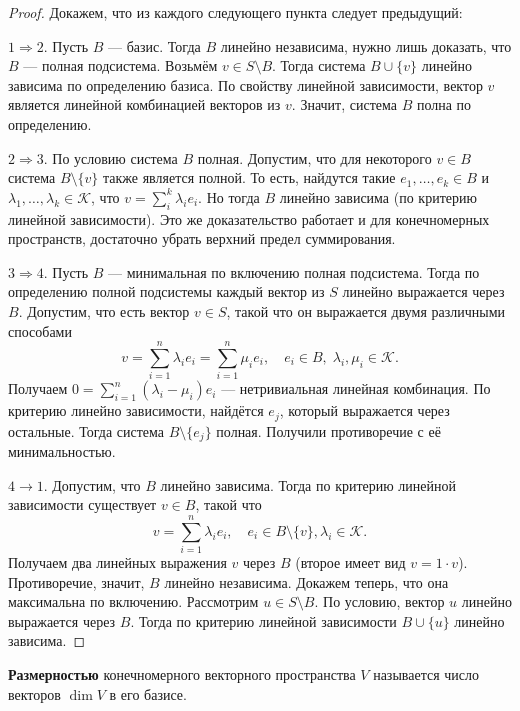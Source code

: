 \begin{proof}
    Докажем, что из каждого следующего пункта следует предыдущий:

    $1 \Rightarrow 2$. Пусть $B$ --- базис. Тогда $B$ линейно независима, нужно лишь доказать, что $B$ --- полная подсистема. Возьмём $v \in S \setminus B$. Тогда система $B \cup \{v\}$ линейно зависима по определению базиса. По свойству линейной зависимости, вектор $v$ является линейной комбинацией векторов из $v$. Значит, система $B$ полна по определению.

    $2 \Rightarrow 3$. По условию система $B$ полная. Допустим, что для некоторого $v \in B$ система $B \setminus \{v\}$ также является полной. То есть, найдутся такие $e_1, \ldots, e_k \in B$ и $\lambda_1, \ldots, \lambda_k \in \mathcal{K}$, что $v = \sum_i^k\lambda_ie_i$. Но тогда $B$ линейно зависима (по критерию линейной зависимости). Это же доказательство работает и для конечномерных пространств, достаточно убрать верхний предел суммирования.

    $3 \Rightarrow 4$. Пусть $B$ --- минимальная по включению полная подсистема. Тогда по определению полной подсистемы каждый вектор из $S$ линейно выражается через $B$. Допустим, что есть вектор $v \in S$, такой что он выражается двумя различными способами
    $$
    v = \sum_{i = 1}^n\lambda_ie_i = \sum_{i = 1}^n\mu_ie_i,\quad e_i \in B,\;\lambda_i,\mu_i \in \mathcal{K}.
    $$
    Получаем $\displaystyle 0 = \sum_{i = 1}^n(\lambda_i - \mu_i)e_i$ --- нетривиальная линейная комбинация. По критерию линейно зависимости, найдётся $e_j$, который выражается через остальные. Тогда система $B \setminus \{e_j\}$ полная. Получили противоречие с её минимальностью.

    $4 \rightarrow 1$. Допустим, что $B$ линейно зависима. Тогда по критерию линейной зависимости существует $v \in B$, такой что
    $$
    v = \sum_{i = 1}^n\lambda_ie_i,\quad e_i \in B \setminus \{v\}, \lambda_i \in \mathcal{K}.
    $$
    Получаем два линейных выражения $v$ через $B$ (второе имеет вид $v = 1 \cdot v$). Противоречие, значит, $B$ линейно независима. Докажем теперь, что она максимальна по включению. Рассмотрим $u \in S \setminus B$. По условию, вектор $u$ линейно выражается через $B$. Тогда по критерию линейной зависимости $B \cup \{u\}$ линейно зависима.
\end{proof}

\begin{definition}
    \textbf{Размерностью} конечномерного векторного пространства $V$ называется число векторов $\dim V$ в его базисе.
\end{definition}

